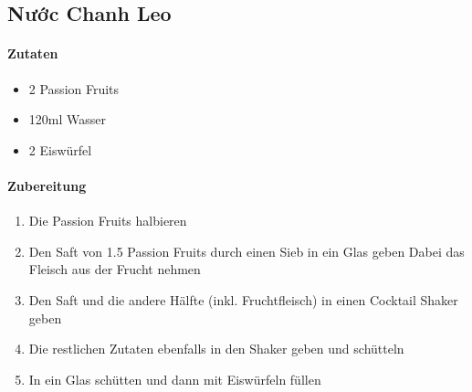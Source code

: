 \newpage
{}
\subsection{Nước Chanh Leo}
\paragraph{Zutaten}
\begin{itemize}[noitemsep]
	\item 2 Passion Fruits
	\item 120ml Wasser
	\item 2 Eiswürfel
\end{itemize}

\paragraph{Zubereitung}
\begin{enumerate}[noitemsep]
	\item Die Passion Fruits halbieren
	\item Den Saft von 1.5 Passion Fruits durch einen Sieb in ein Glas geben 
		{\footnotesize Dabei das Fleisch aus der Frucht nehmen}
	\item Den Saft und die andere Hälfte (inkl. Fruchtfleisch) in einen Cocktail Shaker geben
	\item Die restlichen Zutaten ebenfalls in den Shaker geben und schütteln 
	\item In ein Glas schütten und dann mit Eiswürfeln füllen
\end{enumerate}